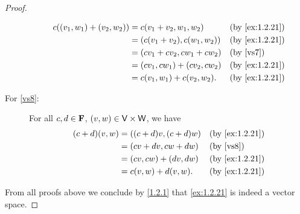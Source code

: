 \begin{proof}
\begin{description}
            \begin{align*}
                c \p{\p{v_{1}, w_{1}} + \p{v_{2}, w_{2}}} & = c \p{v_{1} + v_{2}, w_{1}, w_{2}}         &  & \text{(by \cref{ex:1.2.21})} \\
                                                          & = \p{c\p{v_{1} + v_{2}}, c\p{w_{1}, w_{2}}} &  & \text{(by \cref{ex:1.2.21})} \\
                                                          & = \p{cv_{1} + cv_{2}, cw_{1} + cw_{2}}      &  & \text{(by \ref{vs7})}        \\
                                                          & = \p{cv_{1}, cw_{1}} + \p{cv_{2}, cw_{2}}   &  & \text{(by \cref{ex:1.2.21})} \\
                                                          & = c\p{v_{1}, w_{1}} + c\p{v_{2}, w_{2}}.    &  & \text{(by \cref{ex:1.2.21})}
            \end{align*}
        \item[For \ref{vs8}:]
            For all \(c, d \in \mathbf{F}\), \(\left\lparen v, w\right\rparen \in \mathsf{V} \times \mathsf{W}\), we have
            \begin{align*}
                \p{c + d} \p{v, w} & = \p{\p{c + d} v, \p{c + d} w} &  & \text{(by \cref{ex:1.2.21})} \\
                                   & = \p{cv + dv, cw + dw}         &  & \text{(by \ref{vs8})}        \\
                                   & = \p{cv, cw} + \p{dv, dw}      &  & \text{(by \cref{ex:1.2.21})} \\
                                   & = c\p{v, w} + d\p{v, w}.       &  & \text{(by \cref{ex:1.2.21})}
            \end{align*}
    \end{description}
    From all proofs above we conclude by \cref{1.2.1} that \cref{ex:1.2.21} is indeed a vector space.
\end{proof}
